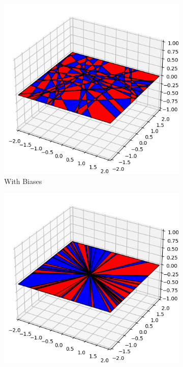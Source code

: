 \documentclass{article}
\theoremstyle{plain}
\theoremstyle{definition}
\theoremstyle{remark}
\begin{document}
\begin{figure}
    \vspace{-43pt}
    \begin{subfigure}{0.49\linewidth}
        \centering
        \includegraphics[width=\linewidth]{fig/ReLU-surface/initialization/quasi-homogeneous.png}
        \caption{With Biases}
    \end{subfigure}
    \begin{subfigure}{0.49\linewidth}
        \centering
        \includegraphics[width=\linewidth]{fig/ReLU-surface/initialization/homogeneous.png}

\end{subfigure}
\end{figure}
\end{document}
